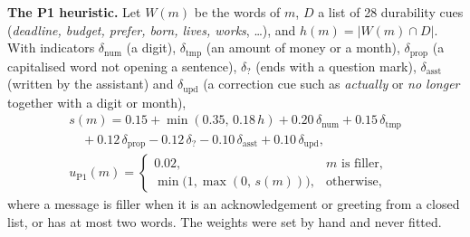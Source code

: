 \textbf{The P1 heuristic.} Let $W(m)$ be the words of $m$, $D$ a list of 28
durability cues (\emph{deadline, budget, prefer, born, lives, works},
\ldots), and $h(m)=|W(m)\cap D|$. With indicators $\delta_{\mathrm{num}}$ (a
digit), $\delta_{\mathrm{tmp}}$ (an amount of money or a month),
$\delta_{\mathrm{prop}}$ (a capitalised word not opening a sentence),
$\delta_{?}$ (ends with a question mark), $\delta_{\mathrm{asst}}$ (written by
the assistant) and $\delta_{\mathrm{upd}}$ (a correction cue such as
\emph{actually} or \emph{no longer} together with a digit or month),
\begin{equation}
\label{eq:p1}
\begin{gathered}
s(m)=0.15+\min(0.35,\,0.18\,h)+0.20\,\delta_{\mathrm{num}}+0.15\,\delta_{\mathrm{tmp}}\\
\quad{}+0.12\,\delta_{\mathrm{prop}}-0.12\,\delta_{?}-0.10\,\delta_{\mathrm{asst}}+0.10\,\delta_{\mathrm{upd}},\\[2pt]
u_{\mathrm{P1}}(m)=
\begin{cases}
0.02, & m \text{ is filler},\\
\min\big(1,\max(0,\,s(m))\big), & \text{otherwise,}
\end{cases}
\end{gathered}
\end{equation}
where a message is filler when it is an acknowledgement or greeting from a
closed list, or has at most two words. The weights were set by hand and never
fitted.

